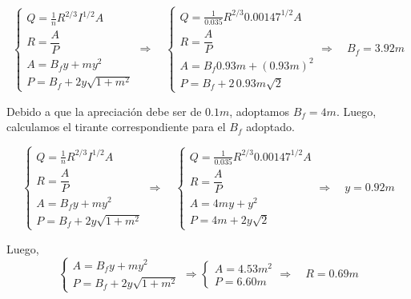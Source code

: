 \begin{equation*}
  \begin{cases}
    Q = \frac{1}{n} R^{2/3} I^{1/2} A \\
    R = \dfrac{A}{P} \\
    A = B_{f}y + m y^{2} \\
    P = B_{f} + 2 y \sqrt{1 + m^{2}}
  \end{cases}
  \Longrightarrow \quad
  \begin{cases}
    Q = \frac{1}{0.035} R^{2/3} 0.00147^{1/2} A \\
    R = \dfrac{A}{P} \\
    A = B_{f}0.93 m + (0.93 m)^2 \\
    P = B_{f} + 2 \, 0.93 m \sqrt{2}
  \end{cases}
  \Longrightarrow \quad
  B_{f} = 3.92 m
\end{equation*}

Debido a que la apreciación debe ser de $0.1 m$, adoptamos $B_{f} = 4 m$.
Luego, calculamos el tirante correspondiente para el $B_{f}$ adoptado.

\begin{equation*}
  \begin{cases}
    Q = \frac{1}{n} R^{2/3} I^{1/2} A \\
    R = \dfrac{A}{P} \\
    A = B_{f}y + m y^{2} \\
    P = B_{f} + 2 y \sqrt{1 + m^{2}}
  \end{cases}
  \Longrightarrow \quad
  \begin{cases}
    Q = \frac{1}{0.035} R^{2/3} 0.00147^{1/2} A \\
    R = \dfrac{A}{P} \\
    A = 4 m y + y^2 \\
    P = 4 m + 2 y \sqrt{2}
  \end{cases}
  \Longrightarrow \quad
  y = 0.92 m
\end{equation*}

Luego,
\begin{equation*}
  \begin{cases}
    A = B_{f}y + m y^{2} \\
    P = B_{f} + 2 y \sqrt{1 + m^{2}}
  \end{cases}
  \Longrightarrow
  \begin{cases}
    A = 4.53 m^2 \\
    P = 6.60 m
  \end{cases}
  \Longrightarrow \quad
  R = 0.69 m
\end{equation*}


